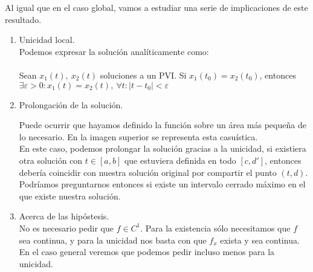 \begin{obs}
    Al igual que en el caso global, vamos a estudiar una serie de implicaciones de este resultado.\\
    \begin{enumerate}
        \item Unicidad local.\\
        Podemos expresar la solución analíticamente como:\\\\
        Sean $x_1(t),\ x_2(t)$ soluciones a un PVI. Si $x_1(t_0) = x_2(t_0)$, entonces $ \exists \varepsilon>0: x_1(t) = x_2(t),\ \forall t : |t-t_0| < \varepsilon$
        \item Prolongación de la solución.\\
        \begin{center}
        \end{center}
        Puede ocurrir que hayamos definido la función sobre un área más pequeña de lo necesario. En la imagen superior se representa esta casuística.\\
        En este caso, podemos prolongar la solución gracias a la unicidad, si existiera otra solución con $t\in[a,b]$ que estuviera definida en todo $[c, d']$, entonces debería coincidir con nuestra solución original por compartir el punto $(t, d)$. Podríamos preguntarnos  entonces si existe un intervalo cerrado máximo en el que existe nuestra solución.
        \item Acerca de las hipóstesis.\\
        No es necesario pedir que $f \in C^1$. Para la existencia sólo necesitamos que $f$ sea continua, y para la unicidad nos basta con que $f_x$ exista y sea continua. En el caso general veremos que podemos pedir incluso menos para la unicidad.
    \end{enumerate}
\end{obs}

